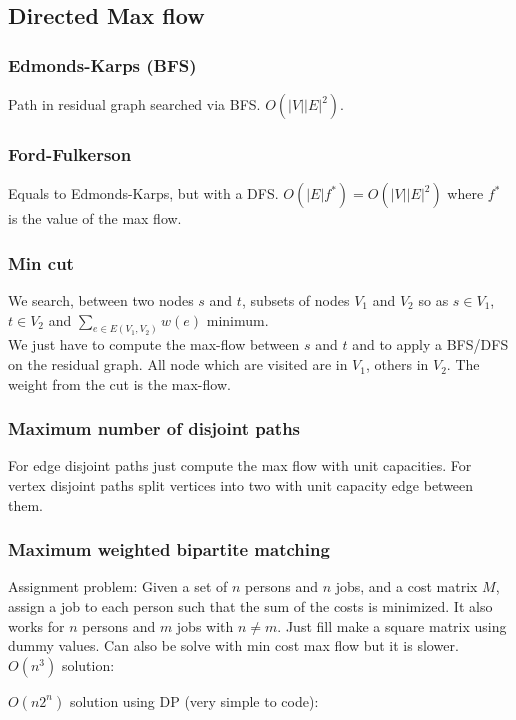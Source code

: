 \subsection{Directed Max flow}
\subsubsection{Edmonds-Karps (BFS)}
Path in residual graph searched via BFS. $O(|V||E|^2)$.\\

\subsubsection{Ford-Fulkerson}
Equals to Edmonds-Karps, but with a DFS. $O(|E|f^*)=O(|V||E|^2)$ where $f^*$ is the value of the max flow.

\subsubsection{Min cut}
We search, between two nodes $s$ and $t$, subsets of nodes $V_1$ and $V_2$ so as $s\in V_1$, $t\in V_2$ and $\sum_{e \in E(V_1, V_2)} w(e)$ minimum.\\
We just have to compute the max-flow between $s$ and $t$ and to apply a BFS/DFS on the residual graph. All node which are visited are in $V_1$, others in $V_2$. The weight from the cut is the max-flow.
\subsubsection{Maximum number of disjoint paths} 
For edge disjoint paths just compute the max flow with unit capacities. For vertex disjoint paths split vertices into two with unit capacity edge between them.
\subsubsection{Maximum weighted bipartite matching}
Assignment problem: Given a set of $n$ persons and $n$ jobs, and a cost matrix $M$, assign a job to each person such that the sum of the costs is minimized. It also works for $n$ persons and $m$ jobs with $n \neq m$. Just fill make a square matrix using dummy values. Can also be solve with min cost max flow but it is slower. \\

$O(n^3)$ solution:

\vspace{0.5cm}
$O(n 2^n)$ solution using DP (very simple to code):


